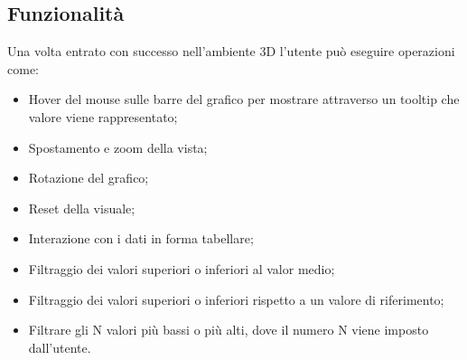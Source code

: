 \newpage


\subsection{Funzionalità}
Una volta entrato con successo nell'ambiente 3D l'utente può eseguire operazioni come:
\begin{itemize}
    \item Hover del mouse sulle barre del grafico per mostrare attraverso un tooltip che valore viene rappresentato;
    \item Spostamento e zoom della vista;
    \item Rotazione del grafico;
    \item Reset della visuale;
    \item Interazione con i dati in forma tabellare;
    \item Filtraggio dei valori superiori o inferiori al valor medio;
    \item Filtraggio dei valori superiori o inferiori rispetto a un valore di riferimento;
    \item Filtrare gli N valori più bassi o più alti, dove il numero N viene imposto dall'utente.
\end{itemize}